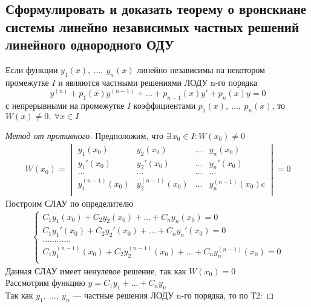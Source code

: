\subsection{Сформулировать и доказать теорему о вронскиане системы линейно независимых частных решений линейного однородного ОДУ}

\begin{theorem*}
    Если функции $y_1(x),\ \ldots,\ y_n(x)$ линейно независимы  на некотором промежутке $I$ и являются частными решениями ЛОДУ n-го порядка
    \[
        y^{(n)} + p_1(x)y^{(n-1)} + \ldots + p_{n-1}(x) y' + p_n(x) y = 0
    \]
    с непрерывными на промежутке $I$ коэффициентами $p_1(x),\ \ldots,\ p_n(x)$, то $W(x) \ne 0,\ \forall x \in I$
\end{theorem*}
\begin{proof}[Метод от противного]
    Предположим, что $\exists\, x_0 \in I\colon W(x_0) \ne 0$
    \begin{gather*}
        W (x_0) = \begin{vmatrix}
            y_1(x_0) & y_2(x_0) & \ldots & y_n(x_0) \\
            y_1'(x_0) & y_2'(x_0) & \ldots & y_n'(x_0) \\
            \ldots & \ldots & \ldots & \ldots \\
            y_1^{(n-1)}(x_0) & y_2^{(n-1)}(x_0) & \ldots & y_n^{(n-1)}(x_0)c\\
        \end{vmatrix} = 0
    \end{gather*}
    Построим СЛАУ по определителю
    \begin{gather*}
        \left\{ \begin{aligned}
            C_1 y_1(x_0) + C_2 y_2(x_0) + \ldots + C_n y_n(x_0) = 0\\
            C_1 y_1'(x_0) + C_2 y_2'(x_0) + \ldots + C_n y_n'(x_0) = 0\\
            \ldots \ldots \ldots \ldots \\
            C_1 y_1^{(n-1)}(x_0) + C_2 y_2^{(n-1)}(x_0) + \ldots + C_n y_n^{(n-1)}(x_0) = 0 \\
        \end{aligned} \right.
    \end{gather*}
    Данная СЛАУ имеет ненулевое решение, так как $W(x_0) = 0$\\
    Рассмотрим функцию $y = C_1y_1 + \ldots + C_ny_n$ \\
    Так как $y_1,\ \ldots,\ y_n$ --- частные решения ЛОДУ n-го порядка, то по Т2:

\end{proof}
